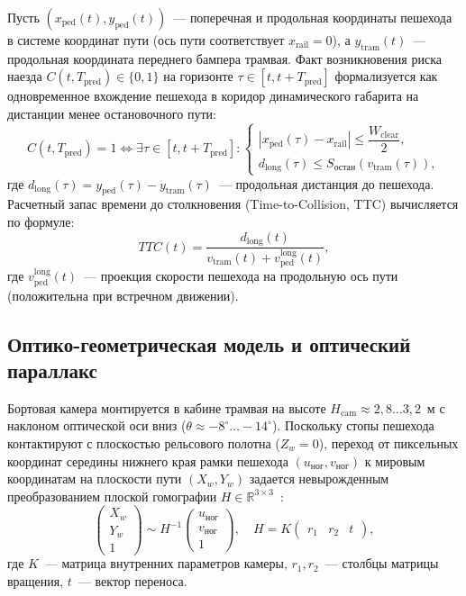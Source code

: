 \documentclass{misisarticle}
\begin{document}
Пусть $(x_{\text{ped}}(t), y_{\text{ped}}(t))$~--- поперечная и продольная координаты пешехода в системе координат пути (ось пути соответствует $x_{\text{rail}} = 0$), а $y_{\text{tram}}(t)$~--- продольная координата переднего бампера трамвая. Факт возникновения риска наезда $C(t, T_{\text{pred}}) \in \{0, 1\}$ на горизонте $\tau \in [t, t + T_{\text{pred}}]$ формализуется как одновременное вхождение пешехода в коридор динамического габарита на дистанции менее остановочного пути:
\begin{equation}
  C(t, T_{\text{pred}}) = 1 \Leftrightarrow \exists \tau \in [t, t + T_{\text{pred}}]:
  \begin{cases}
    |x_{\text{ped}}(\tau) - x_{\text{rail}}| \le \dfrac{W_{\text{clear}}}{2}, \\
    d_{\text{long}}(\tau) \le S_{\text{остан}}(v_{\text{tram}}(\tau)),
  \end{cases}
  \label{eq:collision}
\end{equation}
где $d_{\text{long}}(\tau) = y_{\text{ped}}(\tau) - y_{\text{tram}}(\tau)$~--- продольная дистанция до пешехода. Расчетный запас времени до столкновения (Time-to-Collision, TTC) вычисляется по формуле:
\begin{equation}
  TTC(t) = \frac{d_{\text{long}}(t)}{v_{\text{tram}}(t) + v_{\text{ped}}^{\text{long}}(t)},
  \label{eq:ttc}
\end{equation}
где $v_{\text{ped}}^{\text{long}}(t)$~--- проекция скорости пешехода на продольную ось пути (положительна при встречном движении).

\subsection{Оптико-геометрическая модель и оптический параллакс}

Бортовая камера монтируется в кабине трамвая на высоте $H_{\text{cam}} \approx 2{,}8\dots3{,}2$~м с наклоном оптической оси вниз ($\theta \approx -8^\circ\dots-14^\circ$). Поскольку стопы пешехода контактируют с плоскостью рельсового полотна ($Z_w = 0$), переход от пиксельных координат середины нижнего края рамки пешехода $(u_{\text{ног}}, v_{\text{ног}})$ к мировым координатам на плоскости пути $(X_w, Y_w)$ задается невырожденным преобразованием плоской гомографии $H \in \mathbb{R}^{3 \times 3}$~\cite{hartley2004}:
\begin{equation}
  \begin{pmatrix} X_w \\ Y_w \\ 1 \end{pmatrix} \sim H^{-1} \begin{pmatrix} u_{\text{ног}} \\ v_{\text{ног}} \\ 1 \end{pmatrix}, \quad H = K \begin{pmatrix} r_1 & r_2 & t \end{pmatrix},
  \label{eq:homography}
\end{equation}
где $K$~--- матрица внутренних параметров камеры, $r_1, r_2$~--- столбцы матрицы вращения, $t$~--- вектор переноса.
\end{document}
